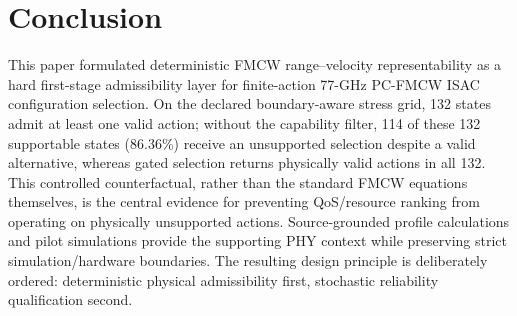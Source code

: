 \documentclass[conference,a4paper]{IEEEtran}
\begin{document}
\section{Conclusion}
This paper formulated deterministic FMCW range--velocity representability as a hard first-stage admissibility layer for finite-action 77-GHz PC-FMCW ISAC configuration selection. On the declared boundary-aware stress grid, 132 states admit at least one valid action; without the capability filter, 114 of these 132 supportable states (86.36\%) receive an unsupported selection despite a valid alternative, whereas gated selection returns physically valid actions in all 132. This controlled counterfactual, rather than the standard FMCW equations themselves, is the central evidence for preventing QoS/resource ranking from operating on physically unsupported actions. Source-grounded profile calculations and pilot simulations provide the supporting PHY context while preserving strict simulation/hardware boundaries. The resulting design principle is deliberately ordered: deterministic physical admissibility first, stochastic reliability qualification second.



\end{document}
